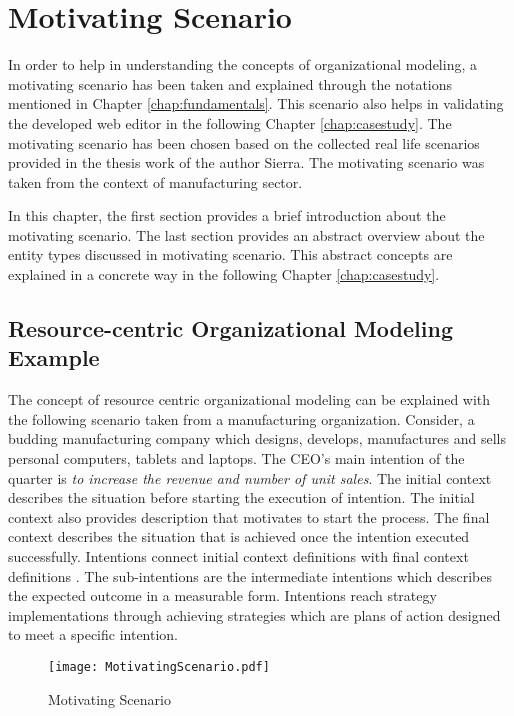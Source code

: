 \chapter{Motivating Scenario}
\label{chap:motivatingScenario}
In order to help in understanding the concepts of organizational modeling, a motivating scenario has been taken and explained through the notations mentioned in Chapter \ref{chap:fundamentals}. This scenario also helps in validating the developed web editor in the following Chapter \ref{chap:casestudy}. The motivating scenario has been chosen based on the collected real life scenarios provided in the thesis work of the author Sierra\cite{Sierr2015}. The motivating scenario was taken from the context of manufacturing sector. 

In this chapter, the first section provides a brief introduction about the motivating scenario. The last section provides an abstract overview about the entity types discussed in motivating scenario. This abstract concepts are explained in a concrete way in the following Chapter \ref{chap:casestudy}.

\section{Resource-centric Organizational Modeling Example}
\label{sec:scenario}
 The concept of resource centric organizational modeling can be explained with the following scenario taken from a manufacturing organization. Consider, a budding manufacturing company which designs, develops, manufactures and sells personal computers, tablets and laptops. The CEO's main intention of the quarter is \textit{to increase the revenue and number of unit sales}. The initial context describes the situation before starting the execution of intention. The initial context also provides description that motivates to start the process. The final context describes the situation that is achieved once the intention executed successfully. Intentions connect initial context definitions with final context definitions \cite{Sungur2014a}. The sub-intentions are the intermediate intentions which describes the expected outcome in a measurable form. Intentions reach strategy implementations through achieving strategies which are plans of action designed to meet a specific intention. 
 
  \begin{figure}
  	\centering
  	\texttt{[image: MotivatingScenario.pdf]}
  	\caption{Motivating Scenario}
  	\label{fig:motivatingscenario}
  \end{figure}
  
